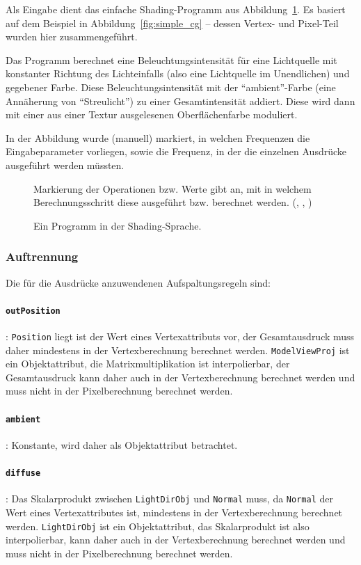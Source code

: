 \documentclass[twoside,a4paper,fleqn,12pt]{book}
\begin{document}
Als Eingabe dient das einfache Shading-Programm aus Abbildung~\ref{fig:simple_s1}.
Es basiert auf dem Beispiel in Abbildung~\ref{fig:simple_cg} -- dessen Vertex- und Pixel-Teil wurden hier zusammengeführt.

Das Programm berechnet eine Beleuchtungsintensität für eine Lichtquelle mit konstanter Richtung des Lichteinfalls (also eine Lichtquelle im
Unendlichen) und gegebener Farbe. Diese Beleuchtungsintensität mit der ``ambient''-Farbe (eine Annäherung von "`Streulicht"')
zu einer Gesamtintensität addiert. Diese wird dann mit einer aus einer Textur ausgelesenen Oberflächenfarbe moduliert.

In der Abbildung wurde (manuell) markiert, in welchen Frequenzen die Eingabeparameter vorliegen,
sowie die Frequenz, in der die einzelnen Ausdrücke ausgeführt werden müssten.

\begin{figure}[ht]
  
  \caption{Ein Programm in der Shading-Sprache.}
  \centering
  \small Markierung der Operationen bzw. Werte gibt an, mit in welchem Berechnungsschritt diese ausgeführt bzw. berechnet werden.
  (, , )
  \label{fig:simple_s1}
\end{figure}

\subsubsection{Auftrennung}

Die für die Ausdrücke anzuwendenen Aufspaltungsregeln sind:

\paragraph{\texttt{outPosition}}: \texttt{Position} liegt ist der Wert eines Vertexattributs vor, der Gesamtausdruck muss daher mindestens 
in der Vertexberechnung berechnet werden. \texttt{ModelViewProj} ist ein Objektattribut, die Matrixmultiplikation ist interpolierbar,
der Gesamtausdruck kann daher auch in der Vertexberechnung berechnet werden und muss nicht in der Pixelberechnung berechnet werden.

\paragraph{\texttt{ambient}}: Konstante, wird daher als Objektattribut betrachtet.

\paragraph{\texttt{diffuse}}: Das Skalarprodukt zwischen \texttt{LightDirObj} und \texttt{Normal} muss, da \texttt{Normal} der Wert eines Vertexattributes ist,
mindestens in der Vertexberechnung berechnet werden. \texttt{LightDirObj} ist ein Objektattribut, das Skalarprodukt ist also interpolierbar,
kann daher auch in der Vertexberechnung berechnet werden und muss nicht in der Pixelberechnung berechnet werden.
\end{document}
